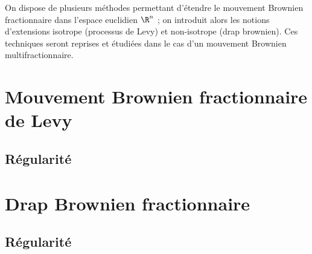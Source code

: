 
On dispose de plusieurs méthodes permettant d'étendre le mouvement
Brownien fractionnaire dans l'espace euclidien $\R^n$ ; on introduit
alors les notions d'extensions isotrope (processus de Levy) et
non-isotrope (drap brownien). Ces techniques seront reprises et
étudiées dans le cas d'un mouvement Brownien multifractionnaire.

\section{Mouvement Brownien fractionnaire de Levy}
\subsection{Régularité}
\section{Drap Brownien fractionnaire}
\subsection{Régularité}
